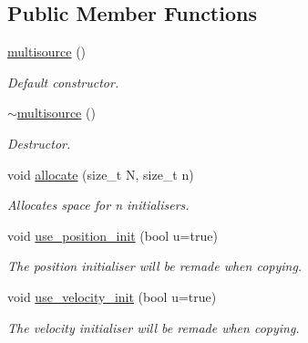 \subsection*{Public Member Functions}
\begin{DoxyCompactItemize}
\item 
\mbox{\label{classphysim_1_1emitters_1_1free__emitters_1_1multisource_a43529c4f6b91b56b6b24c2b4ed97f049}} 
\hyperlink{classphysim_1_1emitters_1_1free__emitters_1_1multisource_a43529c4f6b91b56b6b24c2b4ed97f049}{multisource} ()
\begin{DoxyCompactList}\small\item\em Default constructor. \end{DoxyCompactList}\item 
\mbox{\label{classphysim_1_1emitters_1_1free__emitters_1_1multisource_a4282f4d4c555af38eb82dcfe6383fca4}} 
\hyperlink{classphysim_1_1emitters_1_1free__emitters_1_1multisource_a4282f4d4c555af38eb82dcfe6383fca4}{$\sim$multisource} ()
\begin{DoxyCompactList}\small\item\em Destructor. \end{DoxyCompactList}\item 
void \hyperlink{classphysim_1_1emitters_1_1free__emitters_1_1multisource_ab1f79cb5a7f03279dca7f6b3aa98c903}{allocate} (size\+\_\+t N, size\+\_\+t n)
\begin{DoxyCompactList}\small\item\em Allocates space for {\itshape n} initialisers. \end{DoxyCompactList}\item 
void \hyperlink{classphysim_1_1emitters_1_1free__emitters_1_1multisource_a6848d75a037d33e1b8a046f51a947c19}{use\+\_\+position\+\_\+init} (bool u=true)
\begin{DoxyCompactList}\small\item\em The position initialiser will be remade when copying. \end{DoxyCompactList}\item 
void \hyperlink{classphysim_1_1emitters_1_1free__emitters_1_1multisource_a05fbb3684dbcfdebd7daea7ccbd75cf9}{use\+\_\+velocity\+\_\+init} (bool u=true)
\begin{DoxyCompactList}\small\item\em The velocity initialiser will be remade when copying. \end{DoxyCompactList}\item 

\end{DoxyCompactItemize}
